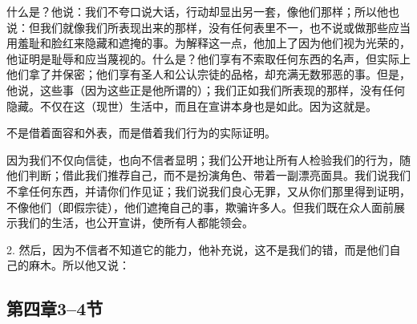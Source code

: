 什么是？他说：我们不夸口说大话，行动却显出另一套，像他们那样；所以他也说：但我们就像我们所表现出来的那样，没有任何表里不一，也不说或做那些应当用羞耻和脸红来隐藏和遮掩的事。为解释这一点，他加上了因为他们视为光荣的，他证明是耻辱和应当蔑视的。什么是？他们享有不索取任何东西的名声，但实际上他们拿了并保密；他们享有圣人和公认宗徒的品格，却充满无数邪恶的事。但是，他说，这些事（因为这些正是他所谓的）；我们正如我们所表现的那样，没有任何隐藏。不仅在这（现世）生活中，而且在宣讲本身也是如此。因为这就是。\par

\par

不是借着面容和外表，而是借着我们行为的实际证明。\par

\par

因为我们不仅向信徒，也向不信者显明；我们公开地让所有人检验我们的行为，随他们判断；借此我们推荐自己，而不是扮演角色、带着一副漂亮面具。我们说我们不拿任何东西，并请你们作见证；我们说我们良心无罪，又从你们那里得到证明，不像他们（即假宗徒），他们遮掩自己的事，欺骗许多人。但我们既在众人面前展示我们的生活，也公开宣讲，使所有人都能领会。\par

2. 然后，因为不信者不知道它的能力，他补充说，这不是我们的错，而是他们自己的麻木。所以他又说：\par


\subsection{第四章3–4节}

\par

